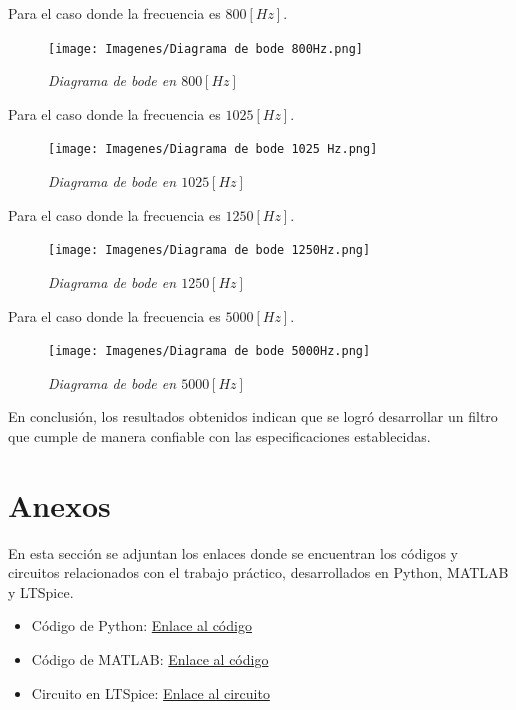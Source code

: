 \documentclass[12pt,A4paper,titlepage]{article}
\begin{document}
\hspace{1mm} Para el caso donde la frecuencia es \(800 [Hz]\).

\begin{figure}[!h] 
  \centering
  \texttt{[image: Imagenes/Diagrama de bode 800Hz.png]}
  \caption{\textit{Diagrama de bode en \(800 [Hz]\)}}
\end{figure}

\newpage
\hspace{1mm} Para el caso donde la frecuencia es \(1025 [Hz]\).

\begin{figure}[!h] 
  \centering
  \texttt{[image: Imagenes/Diagrama de bode 1025 Hz.png]}
  \caption{\textit{Diagrama de bode en \(1025 [Hz]\)}}
\end{figure}

\hspace{1mm} Para el caso donde la frecuencia es \(1250 [Hz]\).

\begin{figure}[!h] 
  \centering
  \texttt{[image: Imagenes/Diagrama de bode 1250Hz.png]}
  \caption{\textit{Diagrama de bode en \(1250 [Hz]\)}}
\end{figure}

\newpage
\hspace{1mm} Para el caso donde la frecuencia es \(5000 [Hz]\).

\begin{figure}[!h] 
  \centering
  \texttt{[image: Imagenes/Diagrama de bode 5000Hz.png]}
  \caption{\textit{Diagrama de bode en \(5000 [Hz]\)}}
\end{figure}

\bigskip
\hspace{1mm} En conclusión, los resultados obtenidos indican que se logró desarrollar un filtro que cumple de manera confiable con las especificaciones establecidas.

\newpage
\section{Anexos}
\hspace{1mm} En esta sección se adjuntan los enlaces donde se encuentran los códigos y circuitos relacionados con el trabajo práctico, desarrollados en Python, MATLAB y LTSpice.

\begin{itemize}
  \item Código de Python: \href{https://drive.google.com/drive/u/1/folders/1fn2AohxBO8u0CoIdvzcblCPVYjSHX1o6}{Enlace al código}
  \item Código de MATLAB: \href{https://drive.google.com/drive/u/1/folders/1jXmiKLY8pMCHEQzc57ifM0zqxy9C7B6I}{Enlace al código}
  \item Circuito en LTSpice: \href{https://drive.google.com/drive/u/1/folders/1w0o-CqxwTwL3AFiesvhs8fyIltAos4nD}{Enlace al circuito}
\end{itemize}
\end{document}
